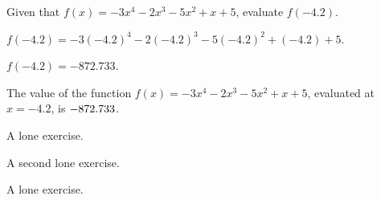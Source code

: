 \documentclass[handout]{ximera}
\begin{document}
\begin{shuffle}
\begin{exercise}
Given that $f(x)=-3 x^4-2 x^3-5 x^2+x+5$, evaluate $f(-4.2)$.
\begin{solution}
\begin{hint}
$f(-4.2)=-3 (-4.2)^4-2 (-4.2)^3-5 (-4.2)^2+(-4.2)+5$.
\end{hint}
\begin{hint}
$f(-4.2)=-872.733$.
\end{hint}
The value of the function $f(x) = -3 x^4-2 x^3-5 x^2+x+5$, evaluated at $x=-4.2$, is ${-872.733}$.
\end{solution}
\end{exercise}
\end{shuffle}


\begin{exercise}
A lone exercise.
\end{exercise}

\begin{exercise}
A second lone exercise.
\end{exercise}

\begin{question}
A lone exercise.
\end{question}
\end{document}
